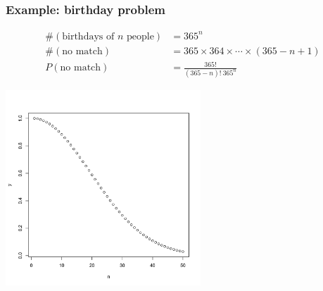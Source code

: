 \documentclass[slidestop,compress,mathserif]{beamer}
\begin{document}
\begin{frame}[fragile]\frametitle{Example: birthday problem}




\pause %

\vspace{-4mm}
\begin{align*}
\#(\text{birthdays of $n$ people}) &= 365^n \\
\#(\text{no match}) &= 365 \times 364 \times \cdots \times (365 - n +1)\\
P(\text{no match}) &= \frac{365!}{(365-n)! ~365^n}
\end{align*}


\pause
\begin{center}
\includegraphics[width = 0.55\textwidth, height = 0.47\textheight]{figures/birthday}
\end{center}

\end{frame}


%
%
%
%
\end{document}
